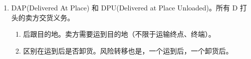 \begin{enumerate}
\begin{enumerate}
\begin{enumerate}
                  \item 关联性的 3 个。FCA(Free Carrier)、CPT(Carriage Paid to)、CIP(Carriage and Insurance Paid to)。
                        \begin{enumerate}
                          \item 适用所有运输方式。装运地交货。货交第一承运人时转移风险。
                          \item 其余各方面 FOB/FCA、CFR/CPT、CIF/CIP 一一对应。
                          \item FCA 的特殊规定。买卖双方可约定买方指示其承运人在货物装船后向卖方签发已装船提单。
                          \item CIP。除非另有约定，卖方需要投保的险别提高到一切险。
                        \end{enumerate}
                \end{enumerate}
          \item DAP(Delivered At Place) 和 DPU(Delivered at Place Unloaded)。所有 D 打头的卖方交货义务。
                \begin{enumerate}
                  \item 后跟目的地。卖方需要运到目的地（不限于运输终点、终端）。
                  \item 区别在运到后是否卸货。风险转移也是，一个运到后，一个卸货后。
                \end{enumerate}
        \end{enumerate}
\end{enumerate}
